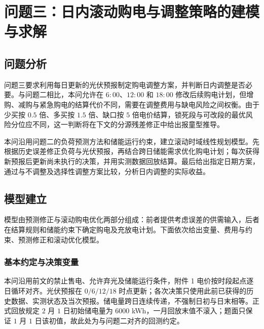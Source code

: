 \section{问题三：日内滚动购电与调整策略的建模与求解}

\subsection{问题分析}

问题三要求利用每日更新的光伏预报制定购电调整方案，并判断日内调整是否必要。与问题二相比，本问允许在 $6{:}00$、$12{:}00$ 和 $18{:}00$ 修改后续购电计划，但增购、减购与紧急购电的结算代价不同，需要在调整费用与缺电风险之间权衡。由于少买按 $0.5$ 倍、多买按 $1.5$ 倍、缺口按 $5$ 倍电价结算，锁死段与可改段的最优风险分位应不同，这一判断将在下文的分源残差修正中给出报童型推导。

本问沿用问题二的负荷预测方法和储能运行约束，建立滚动时域线性规划模型。先根据历史误差修正负荷与光伏预报，再结合跨日储能需求优化购电计划；每次获得新预报后更新尚未执行的决策，并用实测数据回放结算。最后给出指定日期方案，通过与不调整及选择性调整方案比较，分析日内调整的实际收益。

\subsection{模型建立}

模型由预测修正与滚动购电优化两部分组成：前者提供考虑误差的供需输入，后者在结算规则和储能约束下确定购电及充放电计划。下面依次给出变量、费用与约束、预测修正和滚动优化模型。

\subsubsection{基本约定与决策变量}

本问沿用前文的禁止售电、允许弃光及储能运行条件，附件 1 电价按时段起点逐日循环对齐。光伏预报在 $0/6/12/18$ 时点更新；各次决策只使用此前已获得的历史数据、实测状态及当次预报。储电量跨日连续传递，不强制日初与日末相等。正式回放规定 $2$ 月 $1$ 日初始储电量为 $6000$ kWh，一月回放末值不滚入；题面只保证 $1$ 月 $1$ 日该初值，故此处为与问题二对齐的回测约定。

